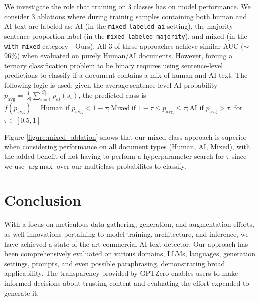 \documentclass[11pt]{article}
\newcommand{\alexa}[1]{{\color{blue}{AA: #1}}}
\newcommand{\gptzero}{GPTZero}
\newcommand{\mixednormal}{\texttt{with mixed}}
\newcommand{\mixedasai}{\texttt{mixed labeled ai}}
\newcommand{\mixedasmajority}{\texttt{mixed labeled majority}}
\DeclareMathOperator*{\argmax}{arg\,max}
\begin{document}
We investigate the role that training on 3 classes has on model performance. We consider 3 ablations where during training samples containing both human and AI text are labeled as: AI (in the \mixedasai{} setting), the majority sentence proportion label (in the \mixedasmajority), and mixed (in the \mixednormal{} category - Ours). All 3 of these approaches achieve similar AUC ($\sim$96\%) when evaluated on purely Human/AI documents. However, forcing a ternary classification problem to be binary requires using sentence-level predictions to classify if a document contains a mix of human and AI text. The following logic is used: given the average sentence-level AI probability $p_{\mathrm{avg}} = \frac{1}{|S|} \sum_{i=1}^{|S|} p_{ai}(s_{i})$, the predicted class is
$f(p_{\mathrm{avg}}) = \text{Human if } p_{\mathrm{avg}} < 1-\tau; \text{Mixed if } 1-\tau \le p_{\mathrm{avg}} \le \tau; \text{AI if } p_{\mathrm{avg}} > \tau.$ for $\tau \in [0.5, 1]$

Figure \ref{figure:mixed_ablation} shows that our mixed class approach is superior when considering performance on all document types (Human, AI, Mixed), with the added benefit of not having to perform a hyperparameter search for $\tau$ since we use $\argmax$ over our multiclass probabilites to classify. 








\section{Conclusion}
With a focus on meticulous data gathering, generation, and augmentation efforts, as well innovations pertaining to model training, architecture, and inference, we have achieved a state of the art commercial AI text detector. Our approach has been comprehensively evaluated on various domains, LLMs, languages, generation settings, prompts, and even possible paraphrasing, demonstrating broad applicability. The transparency provided by \gptzero{} enables users to make informed decisions about trusting content and evaluating the effort expended to generate it. 
\end{document}

